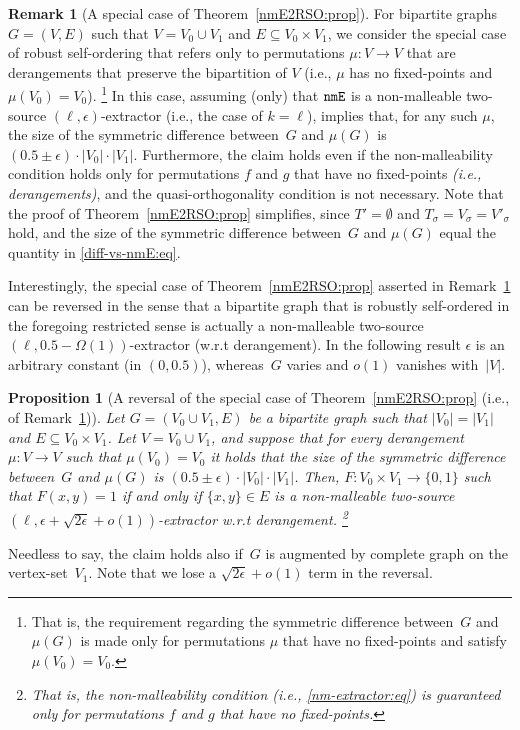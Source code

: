 \documentclass[10pt,a4paper]{article}
\newtheorem{proposition}[theorem]{Proposition}
\theoremstyle{definition}
\newtheorem{remark}[theorem]{Remark}
\newcommand{\e}{\epsilon}
\newcommand{\bitset}{\{0,1\}}
\newcommand{\BP}{\begin{proposition}}   \newcommand{\EP}{\end{proposition}}
\newcommand{\BR}{\begin{remark}}   \newcommand{\ER}{\end{remark}}
\newcommand{\nmE}{{\tt nmE}}
\begin{document}
\BR[A special case of Theorem~\ref{nmE2RSO:prop}]
\label{nmE2RSO:rem}
For bipartite graphs $G=(V,E)$ such that $V=V_0\cup V_1$
and $E\subseteq V_0\times V_1$,
we consider the special case of robust self-ordering
that refers only to permutations $\mu:V\to V$
that are derangements that preserve the bipartition of $V$
{\rm(i.e., $\mu$ has no fixed-points and $\mu(V_0)=V_0$)}.
\footnote{That is, the requirement regarding the symmetric difference
between~$G$ and $\mu(G)$ is made only for permutations $\mu$
that have no fixed-points and satisfy $\mu(V_0)=V_0$.}
%
%
In this case, assuming {\rm(only)} that $\nmE$ is
a non-malleable two-source $(\ell,\e)$-extractor
{\rm(i.e., the case of $k=\ell$)},
implies that, for any such $\mu$,
the size of the symmetric difference between~$G$ and $\mu(G)$
is $(0.5\pm\e)\cdot|V_0|\cdot|V_1|$.
Furthermore, the claim holds even if the non-malleability condition
holds only for permutations $f$ and $g$ that have no fixed-points
{\em(i.e., derangements)},
and the quasi-orthogonality condition is not necessary.
Note that the proof of Theorem~\ref{nmE2RSO:prop} simplifies,
since $T'=\emptyset$ and $T_\sigma=V_\sigma=V'_\sigma$ hold,
and the size of the symmetric difference between~$G$ and $\mu(G)$
equal the quantity in \eqref{diff-vs-nmE:eq}.
\ER
Interestingly, the special case of Theorem~\ref{nmE2RSO:prop}
asserted in Remark~\ref{nmE2RSO:rem} can be reversed in the
sense that a bipartite graph that is robustly self-ordered
in the foregoing restricted sense is actually
a non-malleable two-source $(\ell,0.5-\Omega(1))$-extractor
(w.r.t derangement).
In the following result $\e$ is an arbitrary constant (in $(0,0.5)$),
whereas~$G$ varies and $o(1)$ vanishes with~$|V|$.

\BP[A reversal of the special case of Theorem~\ref{nmE2RSO:prop}
(i.e., of Remark~\ref{nmE2RSO:rem})]
\label{reverse-nmE2RSO:prop}
Let $G=(V_0\cup V_1,E)$ be a bipartite graph
such that $|V_0|=|V_1|$ and $E\subseteq V_0\times V_1$.
%
%
Let $V=V_0\cup V_1$, and
suppose that for every derangement $\mu:V\to V$
such that $\mu(V_0)=V_0$ it holds that the
size of the symmetric difference between~$G$ and $\mu(G)$
is $(0.5\pm\e)\cdot|V_0|\cdot|V_1|$.
Then, $F:V_0\times V_1\to\bitset$
such that $F(x,y)=1$ if and only if $\{x,y\}\in E$
is a non-malleable two-source $(\ell,\e+{\sqrt{2\e}}+o(1))$-extractor
w.r.t derangement.
\footnote{That is, the non-malleability condition
(i.e., \eqref{nm-extractor:eq}) is guaranteed
only for permutations $f$ and $g$ that have no fixed-points.}
\EP
Needless to say, the claim holds also if~$G$ is augmented
by complete graph on the vertex-set~$V_1$.
Note that we lose a $\sqrt{2\e}+o(1)$ term in the reversal.
%
%
\medskip
\end{document}
